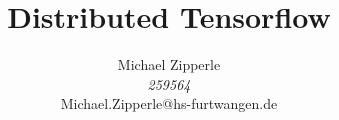 \documentclass[journal]{IEEEtran}
\begin{document}
\title{Distributed Tensorflow}

\author{\begin{center}
 Michael Zipperle \\ 
 \textit{259564} \\
 Michael.Zipperle@hs-furtwangen.de \\
\end{center}}%
        

\maketitle


\begin{abstract}


\end{abstract}
\IEEEpeerreviewmaketitle










\ifCLASSOPTIONcaptionsoff
  \newpage
\fi
\end{document}
